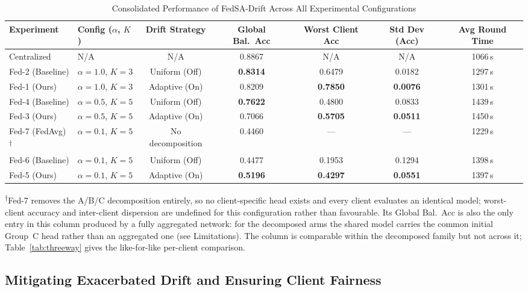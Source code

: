 \documentclass[utf8]{FrontiersinHarvard} %
\newcommand{\sadrift}{FedSA-Drift}
\begin{document}
\begin{table}[t]
\centering
\caption{Consolidated Performance of \sadrift{} Across All Experimental Configurations}
\label{tab:consolidated_performance}
\footnotesize
\setlength{\tabcolsep}{3pt}
\begin{tabular}{llccccc}
\toprule
Experiment & Config ($\alpha$, $K$) & Drift Strategy & Global Bal.\ Acc & Worst Client Acc & Std Dev (Acc) & Avg Round Time \\
\midrule
Centralized & N/A & N/A & 0.8867 & N/A & N/A & 1066\,s \\
Fed-2 (Baseline) & $\alpha{=}1.0$, $K{=}3$ & Uniform (Off) & \textbf{0.8314} & 0.6479 & 0.0182 & 1297\,s \\
Fed-1 (Ours) & $\alpha{=}1.0$, $K{=}3$ & Adaptive (On) & 0.8209 & \textbf{0.7850} & \textbf{0.0076} & 1301\,s \\
Fed-4 (Baseline) & $\alpha{=}0.5$, $K{=}5$ & Uniform (Off) & \textbf{0.7622} & 0.4800 & 0.0833 & 1439\,s \\
Fed-3 (Ours) & $\alpha{=}0.5$, $K{=}5$ & Adaptive (On) & 0.7066 & \textbf{0.5705} & \textbf{0.0511} & 1450\,s \\
\midrule
Fed-7 (FedAvg)\textsuperscript{$\dagger$} & $\alpha{=}0.1$, $K{=}5$ & No decomposition & 0.4460 & --- & --- & 1229\,s \\
Fed-6 (Baseline) & $\alpha{=}0.1$, $K{=}5$ & Uniform (Off) & 0.4477 & 0.1953 & 0.1294 & 1398\,s \\
Fed-5 (Ours) & $\alpha{=}0.1$, $K{=}5$ & Adaptive (On) & \textbf{0.5196} & \textbf{0.4297} & \textbf{0.0551} & 1397\,s \\
\bottomrule
\end{tabular}

\vspace{2pt}
{\footnotesize \textsuperscript{$\dagger$}Fed-7 removes the A/B/C decomposition entirely, so no client-specific head exists and every client evaluates an identical model; worst-client accuracy and inter-client dispersion are undefined for this configuration rather than favourable. Its Global Bal.\ Acc is also the only entry in this column produced by a fully aggregated network: for the decomposed arms the shared model carries the common initial Group~C head rather than an aggregated one (see Limitations). The column is comparable within the decomposed family but not across it; Table~\ref{tab:threeway} gives the like-for-like per-client comparison.}
\end{table}

\subsection{Mitigating Exacerbated Drift and Ensuring Client Fairness}
\end{document}

